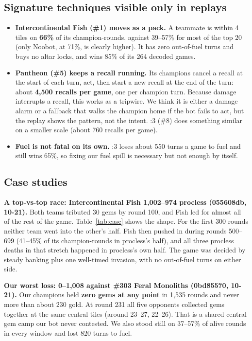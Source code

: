 \documentclass[11pt,a4paper]{article}
\begin{document}
\subsection{Signature techniques visible only in replays}

\begin{itemize}[leftmargin=1.2em, itemsep=0.3em]
\item \textbf{Intercontinental Fish (\#1) moves as a pack.} A teammate is within 4 tiles on \textbf{66\%} of its champion-rounds, against 39--57\% for most of the top 20 (only Noobot, at 71\%, is clearly higher). It has zero out-of-fuel turns and buys no altar locks, and wins 85\% of its 264 decoded games.
\item \textbf{Pantheon (\#5) keeps a recall running.} Its champions cancel a recall at the start of each turn, act, then start a new recall at the end of the turn: about \textbf{4,500 recalls per game}, one per champion turn. Because damage interrupts a recall, this works as a tripwire. We think it is either a damage alarm or a fallback that walks the champion home if the bot fails to act, but the replay shows the pattern, not the intent. :3 (\#8) does something similar on a smaller scale (about 760 recalls per game).
\item \textbf{Fuel is not fatal on its own.} :3 loses about 550 turns a game to fuel and still wins 65\%, so fixing our fuel spill is necessary but not enough by itself.
\end{itemize}

\subsection{Case studies}

\textbf{A top-vs-top race: Intercontinental Fish 1,002--974 procless (055608db, 10-21).} Both teams tributed 30 gems by round 100, and Fish led for almost all of the rest of the game. Table~\ref{tab:case} shows the shape. For the first 300 rounds neither team went into the other's half. Fish then pushed in during rounds 500--699 (41--45\% of its champion-rounds in procless's half), and all three procless deaths in that stretch happened in procless's own half. The game was decided by steady banking plus one well-timed invasion, with no out-of-fuel turns on either side.

\textbf{Our worst loss: 0--1,008 against \#303 Feral Monoliths (0bd85570, 10-21).} Our champions held \textbf{zero gems at any point} in 1,535 rounds and never more than about 230 gold. At round 231 all five opponents collected gems together at the same central tiles (around 23--27, 22--26). That is a shared central gem camp our bot never contested. We also stood still on 37--57\% of alive rounds in every window and lost 820 turns to fuel.
\end{document}
